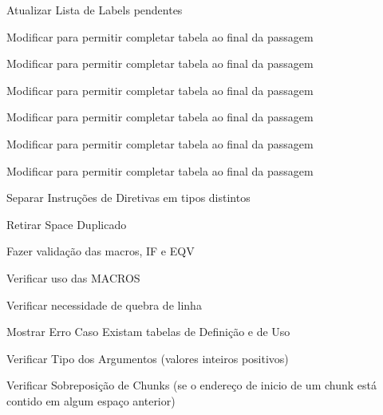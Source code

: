 
\begin{DoxyRefList}
\item[\label{todo__todo000001}%
\hypertarget{todo__todo000001}{}%
Membro \hyperlink{assembler_8cpp_a54fad2c006413b60d87eea48e412471b}{add\-New\-Label} (string str\-Label, int addr\-Label, int line\-Count, string line)]Atualizar Lista de Labels pendentes  
\item[\label{todo__todo000002}%
\hypertarget{todo__todo000002}{}%
Membro \hyperlink{assembler_8cpp_a45dcd38a718d16b9fdcda1e45c4ad5de}{add\-New\-Symbol\-I\-N\-S\-T1} (string str\-Inst1, string str\-Arg1, int line\-Count, string line)]Modificar para permitir completar tabela ao final da passagem  
\item[\label{todo__todo000003}%
\hypertarget{todo__todo000003}{}%
Membro \hyperlink{assembler_8cpp_ad85cc701dcbc6e69b1c273a99c2262d8}{add\-New\-Symbol\-I\-N\-S\-T1\-P\-L\-U\-S} (string str\-Inst1, string str\-Arg1, int num\-Arg1\-Plus, int line\-Count, string line)]Modificar para permitir completar tabela ao final da passagem  
\item[\label{todo__todo000004}%
\hypertarget{todo__todo000004}{}%
Membro \hyperlink{assembler_8cpp_a4b08bb4206172aa8ae36e47f8298e274}{add\-New\-Symbol\-I\-N\-S\-T2} (string str\-Inst2, string str\-Arg1, string str\-Arg2, int line\-Count, string line)]Modificar para permitir completar tabela ao final da passagem 

Modificar para permitir completar tabela ao final da passagem  
\item[\label{todo__todo000006}%
\hypertarget{todo__todo000006}{}%
Membro \hyperlink{assembler_8cpp_a23fbad662368f294c55a33dfa57a904c}{add\-New\-Symbol\-I\-N\-S\-T2\-P\-L\-U\-S\-P\-L\-U\-S} (string str\-Inst2, string str\-Arg1, int num\-Arg1\-Plus, string str\-Arg2, int num\-Arg2\-Plus, int line\-Count, string line)]Modificar para permitir completar tabela ao final da passagem 

Modificar para permitir completar tabela ao final da passagem  
\item[\label{todo__todo000008}%
\hypertarget{todo__todo000008}{}%
Membro \hyperlink{languagedefinition_8h_a1830ff5737e4f1610e975ee2aa489206}{Instruction\-Code} ]Separar Instruções de Diretivas em tipos distintos 

Retirar Space Duplicado  
\item[\label{todo__todo000012}%
\hypertarget{todo__todo000012}{}%
Membro \hyperlink{macroeval_8h_afd6754ab646ddc8aa952e7d63cb5ad81}{macroeval} (string input\-\_\-file, string output\-\_\-file)]Fazer validação das macros, I\-F e E\-Q\-V 

Verificar uso das M\-A\-C\-R\-O\-S 

Verificar necessidade de quebra de linha  
\item[\label{todo__todo000009}%
\hypertarget{todo__todo000009}{}%
Membro \hyperlink{linker_8cpp_a3c04138a5bfe5d72780bb7e82a18e627}{main} (int argc, char $\ast$$\ast$argv)]Mostrar Erro Caso Existam tabelas de Definição e de Uso 

Verificar Tipo dos Argumentos (valores inteiros positivos) 

Verificar Sobreposição de Chunks (se o endereço de inicio de um chunk está contido em algum espaço anterior) 
\end{DoxyRefList}